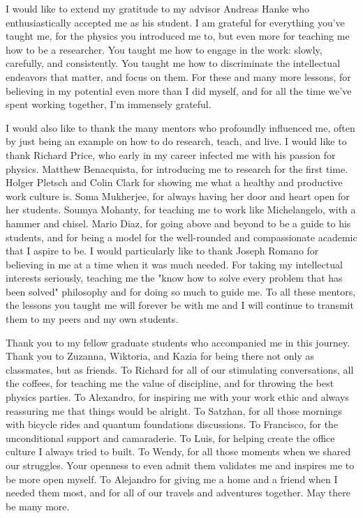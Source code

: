     
I would like to extend my gratitude to my advisor Andreas Hanke who enthusiastically accepted me as his student. I am grateful for everything you've taught me, for the physics you introduced me to, but even more for teaching me how to be a researcher. You taught me how to engage in the work: slowly, carefully, and consistently. You taught me how to discriminate the intellectual endeavors that matter, and focus on them. For these and many more lessons, for believing in my potential even more than I did myself, and for all the time we've spent working together, I'm immensely grateful.

I would also like to thank the many mentors who profoundly influenced me, often by just being an example on how to do research, teach, and live. I would like to thank Richard Price, who early in my career infected me with his passion for physics. Matthew Benacquista, for introducing me to research for the first time. Holger Pletsch and Colin Clark for showing me what a healthy and productive work culture is. Soma Mukherjee, for always having her door and heart open for her students. Soumya Mohanty, for teaching me to work like Michelangelo, with a hammer and chisel. Mario Diaz, for going above and beyond to be a guide to his students, and for being a model for the well-rounded and compassionate academic that I aspire to be. I would particularly like to thank Joseph Romano for believing in me at a time when it was much needed. For taking my intellectual interests seriously, teaching me the "know how to solve every problem that has been solved" philosophy and for doing so much to guide me. To all these mentors, the lessons you taught me will forever be with me and I will continue to transmit them to my peers and my own students.

\newpage

\thispagestyle{fancy}
\setlength{\parindent}{0.5in}
\doublespacing


Thank you to my fellow graduate students who accompanied me in this journey. Thank you to Zuzanna, Wiktoria, and Kazia for being there not only as classmates, but as friends. To Richard for all of our stimulating conversations, all the coffees, for teaching me the value of discipline, and for throwing the best physics parties. To Alexandro, for inspiring me with your work ethic and always reassuring me that things would be alright. To Satzhan, for all those mornings with bicycle rides and quantum foundations discussions. To Francisco, for the unconditional support and camaraderie. To Luis, for helping create the office culture I always tried to built. To Wendy, for all those moments when we shared our struggles. Your openness to even admit them validates me and inspires me to be more open myself. To Alejandro for giving me a home and a friend when I needed them most, and for all of our travels and adventures together. May there be many more.

